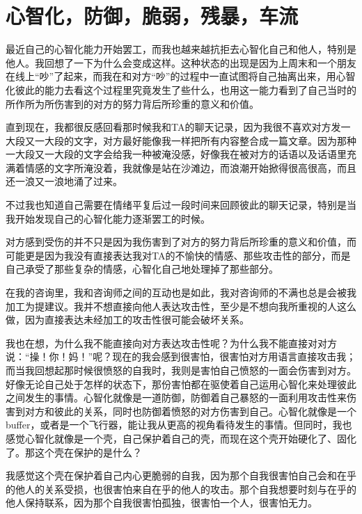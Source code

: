 \chapter{心智化，防御，脆弱，残暴，车流}






最近自己的心智化能力开始罢工，而我也越来越抗拒去心智化自己和他人，特别是他人。我回想了一下为什么会变成这样。这种状态的出现是因为上周末和一个朋友在线上“吵”了起来，而我在和对方“吵”的过程中一直试图将自己抽离出来，用心智化彼此的能力去看这个过程里究竟发生了些什么，也用这一能力看到了自己当时的所作所为所伤害到的对方的努力背后所珍重的意义和价值。

直到现在，我都很反感回看那时候我和TA的聊天记录，因为我很不喜欢对方发一大段又一大段的文字，对方最好能像我一样把所有内容整合成一篇文章。因为那种一大段又一大段的文字会给我一种被淹没感，好像我在被对方的话语以及话语里充满着情感的文字所淹没着，我就像是站在沙滩边，而浪潮开始掀得很高很高，而且还一浪又一浪地涌了过来。

不过我也知道自己需要在情绪平复后过一段时间来回顾彼此的聊天记录，特别是当我开始发现自己的心智化能力逐渐罢工的时候。

对方感到受伤的并不只是因为我伤害到了对方的努力背后所珍重的意义和价值，而可能更是因为我没有直接表达我对TA的不愉快的情感、那些攻击性的部分，而是自己承受了那些复杂的情感，心智化自己地处理掉了那些部分。

在我的咨询里，我和咨询师之间的互动也是如此，我对咨询师的不满也总是会被我加工为提建议。我并不想直接向他人表达攻击性，至少是不想向我所重视的人这么做，因为直接表达未经加工的攻击性很可能会破坏关系。

我也在想，为什么我不能直接向对方表达攻击性呢？为什么我不能直接对对方说：“操！你！妈！”呢？现在的我会感到很害怕，很害怕对方用语言直接攻击我；而当我回想起那时候很愤怒的自我时，我则是害怕自己愤怒的一面会伤害到对方。好像无论自己处于怎样的状态下，那份害怕都在驱使着自己运用心智化来处理彼此之间发生的事情。心智化就像是一道防御，防御着自己暴怒的一面利用攻击性来伤害到对方和彼此的关系，同时也防御着愤怒的对方伤害到自己。心智化就像是一个buffer，或者是一个飞行器，能让我从更高的视角看待发生的事情。但同时，我也感觉心智化就像是一个壳，自己保护着自己的壳，而现在这个壳开始硬化了、固化了。那这个壳在保护的是什么？

我感觉这个壳在保护着自己内心更脆弱的自我，因为那个自我很害怕自己会和在乎的他人的关系受损，也很害怕来自在乎的他人的攻击。那个自我想要时刻与在乎的他人保持联系，因为那个自我很害怕孤独，很害怕一个人，很害怕无力。

